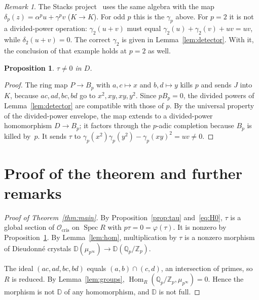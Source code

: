 \documentclass[11pt]{amsart}
\newtheorem{proposition}[theorem]{Proposition}
\theoremstyle{remark}
\newtheorem{remark}[theorem]{Remark}
\newcommand{\Zp}{\mathbb{Z}_p}
\newcommand{\Qp}{\mathbb{Q}_p}
\newcommand{\D}{\mathbb{D}}
\newcommand{\Ocris}{\mathcal{O}_{\mathrm{cris}}}
\newcommand{\Hom}{\operatorname{Hom}}
\newcommand{\Spec}{\operatorname{Spec}}
\newcommand{\mup}{\mu_{p^\infty}}
\newcommand{\QZ}{\Qp/\Zp}
\begin{document}
\begin{remark}\label{rem:stacks}
The Stacks project~\cite[Example~07LJ]{Stacks} uses the same algebra with the map $\delta_p(z)=\alpha^pu+\gamma^pv$
($K\to K$). For odd $p$ this is the $\gamma_p$ above. For $p=2$ it is not a divided-power operation:
$\gamma_2(u+v)$ must equal $\gamma_2(u)+\gamma_2(v)+uv=uv$, while $\delta_2(u+v)=0$. The correct $\gamma_2$ is given in
Lemma~\ref{lem:detector}. With it, the conclusion of that example holds at $p=2$ as well.
\end{remark}

\begin{proposition}\label{prop:nonzero}
$\tau\neq0$ in $D$.
\end{proposition}

\begin{proof}
The ring map $P\to B_p$ with $a,c\mapsto x$ and $b,d\mapsto y$ kills $p$ and sends $J$ into~$K$, because $ac,ad,bc,bd$
go to $x^2,xy,xy,y^2$. Since $pB_p=0$, the divided powers of Lemma~\ref{lem:detector} are compatible with those of $p$.
By the universal property of the divided-power envelope, the map extends to a divided-power homomorphism $D\to B_p$; it
factors through the $p$-adic completion because $B_p$ is killed by~$p$. It sends $\tau$ to
$\gamma_p(x^2)\gamma_p(y^2)-\gamma_p(xy)^2=uv\neq0$.
\end{proof}

\section{Proof of the theorem and further remarks}

\begin{proof}[Proof of Theorem~\ref{thm:main}]
By Proposition~\ref{prop:tau} and~\eqref{eq:H0}, $\tau$ is a global section of $\Ocris$ on $\Spec R$ with
$p\tau=0=\varphi(\tau)$. It is nonzero by Proposition~\ref{prop:nonzero}. By Lemma~\ref{lem:hom}, multiplication by
$\tau$ is a nonzero morphism of Dieudonn\'e crystals $\D(\mup)\to\D(\QZ)$.

The ideal $(ac,ad,bc,bd)$ equals $(a,b)\cap(c,d)$, an intersection of primes, so $R$ is reduced. By
Lemma~\ref{lem:groups}, $\Hom_R(\QZ,\mup)=0$. Hence the morphism is not $\D$ of any homomorphism, and $\D$ is not
full.
\end{proof}
\end{document}
